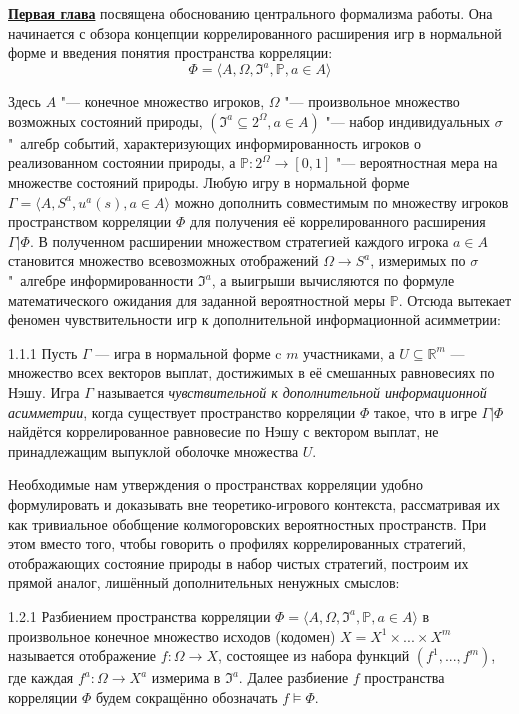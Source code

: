 \underline{\textbf{Первая глава}} посвящена обоснованию центрального формализма работы. Она начинается с обзора концепции коррелированного расширения игр в нормальной форме и введения понятия пространства корреляции:
\begin{equation*}
	\Phi = \langle A, \Omega, \mathfrak{I}^a, \mathbb{P}, a \in A \rangle
\end{equation*}

Здесь $A$ "--- конечное множество игроков, $\Omega$ "--- произвольное множество возможных состояний природы, $(\mathfrak{I}^a \subseteq 2^\Omega, a \in A)$ "--- набор индивидуальных $\sigma$"~алгебр событий, характеризующих информированность игроков о реализованном состоянии природы, а $\mathbb{P} : 2^\Omega \rightarrow [0, 1]$ "--- вероятностная мера на множестве состояний природы. Любую игру в нормальной форме $\Gamma = \langle A, S^a, u^a(s), a \in A \rangle$ можно дополнить совместимым по множеству игроков пространством корреляции $\Phi$ для получения её коррелированного расширения $\Gamma | \Phi$. В полученном расширении множеством стратегией каждого игрока $a \in A$ становится множество  всевозможных отображений $\Omega \rightarrow S^a$, измеримых по $\sigma$"~алгебре информированности $\mathfrak{I}^a$, а выигрыши вычисляются по формуле математического ожидания для заданной вероятностной меры $\mathbb{P}$. Отсюда вытекает феномен чувствительности игр к дополнительной информационной асимметрии:
\begin{definition}{1.1.1}
	Пусть $\Gamma$ --- игра в нормальной форме c $m$ участниками, а $U \subseteq \mathbb{R}^m$ --- множество всех векторов выплат, достижимых в её смешанных равновесиях по Нэшу. Игра $\Gamma$ называется \emph{чувствительной к дополнительной информационной асимметрии}, когда существует пространство корреляции $\Phi$ такое, что в игре $\Gamma | \Phi$ найдётся коррелированное равновесие по Нэшу с вектором выплат, не принадлежащим выпуклой оболочке множества $U$.
\end{definition}

Необходимые нам утверждения о пространствах корреляции удобно формулировать и доказывать вне теоретико-игрового контекста, рассматривая их как тривиальное обобщение колмогоровских вероятностных пространств. При этом вместо того, чтобы говорить о профилях коррелированных стратегий, отображающих состояние природы в набор чистых стратегий, построим их прямой аналог, лишённый дополнительных ненужных смыслов:
\begin{definition}{1.2.1}
	Разбиением пространства корреляции $\Phi = \langle A, \Omega, \mathfrak{I}^a, \mathbb{P}, a \in A \rangle$ в произвольное конечное множество исходов (кодомен) $X = X^1 \times ... \times X^m$ называется отображение $f : \Omega \rightarrow X$, состоящее из набора функций $(f^1, ..., f^m)$, где каждая $f^a : \Omega \rightarrow X^a$ измерима в $\mathfrak{I}^a$. Далее разбиение $f$ пространства корреляции $\Phi$ будем сокращённо обозначать $f \models \Phi$.
\end{definition}

